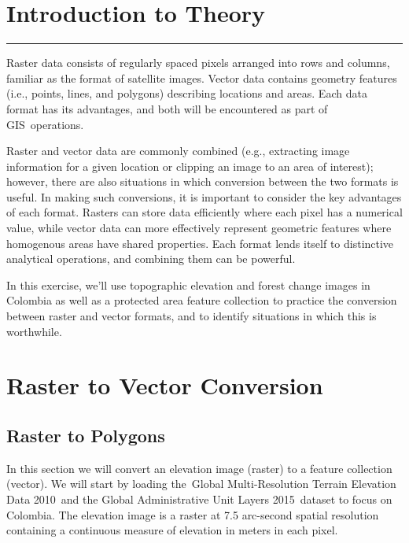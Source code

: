 \documentclass[
  letterpaper,
  DIV=11,
  numbers=noendperiod]{scrreprt}
\begin{document}
\hypertarget{introduction-to-theory-12}{%
\section*{Introduction to Theory}\label{introduction-to-theory-12}}


\begin{center}\rule{0.5\linewidth}{0.5pt}\end{center}

Raster data consists of regularly spaced pixels arranged into rows and
columns, familiar as the format of satellite images. Vector data
contains geometry features (i.e., points, lines, and polygons)
describing locations and areas. Each data format has its advantages, and
both will be encountered as part of GIS~operations.

Raster and vector data are commonly combined (e.g., extracting image
information for a given location or clipping an image to an area of
interest); however, there are also situations in which conversion
between the two formats is useful. In making such conversions, it is
important to consider the key advantages of each format. Rasters can
store data efficiently where each pixel has a numerical value, while
vector data can more effectively represent geometric features where
homogenous areas have shared properties. Each format lends itself to
distinctive analytical operations, and combining them can be powerful.

In this exercise, we'll use topographic elevation and forest change
images in Colombia as well as a protected area feature collection to
practice the conversion between raster and vector formats, and to
identify situations in which this is worthwhile.

\hypertarget{raster-to-vector-conversion}{%
\section{Raster to Vector
Conversion~}\label{raster-to-vector-conversion}}

\hypertarget{raster-to-polygons}{%
\subsection{Raster to Polygons}\label{raster-to-polygons}}

In this section we will convert an elevation image (raster) to a feature
collection (vector). We will start by loading the~Global
Multi-Resolution Terrain Elevation Data 2010~and the Global
Administrative Unit Layers 2015~dataset to focus on Colombia. The
elevation image is a raster at 7.5 arc-second spatial resolution
containing a continuous measure of elevation in meters in each pixel.
\end{document}

